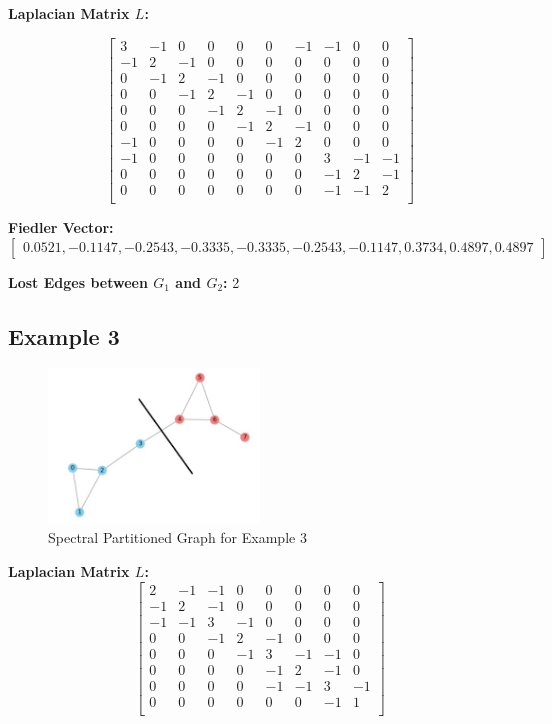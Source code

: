 \documentclass[hidelinks,12pt]{article}
\begin{document}
\noindent\textbf{Laplacian Matrix \(L\):}
\begin{adjustbox}{max width=\textwidth}
\[
\begin{bmatrix}
3 & -1 & 0 & 0 & 0 & 0 & -1 & -1 & 0 & 0 \\
-1 & 2 & -1 & 0 & 0 & 0 & 0  & 0  & 0 & 0 \\
0 & -1 & 2 & -1 & 0 & 0 & 0  & 0  & 0 & 0 \\
0 &  0 & -1 & 2 & -1 & 0 & 0  & 0  & 0 & 0 \\
0 &  0 & 0 & -1 & 2 & -1 & 0  & 0  & 0 & 0 \\
0 &  0 & 0 & 0  & -1 & 2 & -1 & 0  & 0 & 0 \\
-1 &  0 & 0 & 0  & 0  & -1 & 2  & 0  & 0 & 0 \\
-1 &  0 & 0 & 0  & 0  & 0  & 0  & 3  & -1 & -1 \\
0 &  0 & 0 & 0  & 0  & 0  & 0  & -1 & 2  & -1 \\
0 &  0 & 0 & 0  & 0  & 0  & 0  & -1 & -1 & 2 \\
\end{bmatrix}
\]
\end{adjustbox}

\noindent\textbf{Fiedler Vector:}
\[
\begin{bmatrix}
0.0521, -0.1147, -0.2543, -0.3335, -0.3335, -0.2543, -0.1147, 0.3734, 0.4897, 0.4897
\end{bmatrix}
\]

\noindent\textbf{Lost Edges between \(G_1\) and \(G_2\):} 2
\newpage
\subsection*{Example 3}

\begin{figure}[h!]
\centering
\includegraphics[width=0.5\textwidth]{figures/image10.jpeg}
\caption{Spectral Partitioned Graph for Example 3}
\end{figure}

\noindent\textbf{Laplacian Matrix \(L\):}
\[
\begin{bmatrix}
2 & -1 & -1 &  0 &  0 &  0 &  0 &  0 \\
-1 & 2 & -1 &  0 &  0 &  0 &  0 &  0 \\
-1 & -1 & 3 & -1 &  0 &  0 &  0 &  0 \\
0 &  0 & -1 & 2 & -1 &  0 &  0 &  0 \\
0 &  0 &  0 & -1 & 3 & -1 & -1 &  0 \\
0 &  0 &  0 &  0 & -1 & 2 & -1 &  0 \\
0 &  0 &  0 &  0 & -1 & -1 & 3 & -1 \\
0 &  0 &  0 &  0 &  0 &  0 & -1 & 1 \\
\end{bmatrix}
\]
\end{document}
